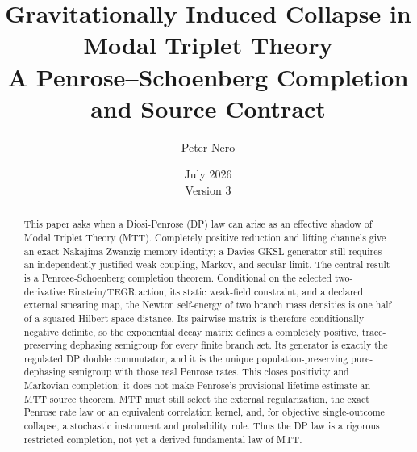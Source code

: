 \documentclass[11pt]{article}
\title{\textbf{Gravitationally Induced Collapse in Modal Triplet Theory}\\
\large A Penrose--Schoenberg Completion and Source Contract}
\author{Peter Nero}
\date{July 2026\\Version 3}
\begin{document}
\maketitle

\begin{abstract}
This paper asks when a Diosi-Penrose (DP) law can arise as an effective
shadow of Modal Triplet Theory (MTT). Completely positive reduction and
lifting channels give an exact Nakajima-Zwanzig memory identity; a
Davies-GKSL generator still requires an independently justified
weak-coupling, Markov, and secular limit. The central result is a
Penrose-Schoenberg completion theorem. Conditional on the selected
two-derivative Einstein/TEGR action, its static weak-field constraint, and a
declared external smearing map, the Newton self-energy of two branch mass
densities is one half of a squared Hilbert-space distance. Its pairwise
matrix is therefore conditionally negative definite, so the exponential
decay matrix defines a completely positive, trace-preserving dephasing
semigroup for every finite branch set. Its generator is exactly the
regulated DP double commutator, and it is the unique population-preserving
pure-dephasing semigroup with those real Penrose rates. This closes
positivity and Markovian completion; it does not make Penrose's provisional
lifetime estimate an MTT source theorem. MTT must still select the external
regularization, the exact Penrose rate law or an equivalent correlation
kernel, and, for objective single-outcome collapse, a stochastic instrument
and probability rule. Thus the DP law is a rigorous restricted completion,
not yet a derived fundamental law of MTT.
\end{abstract}
\end{document}

